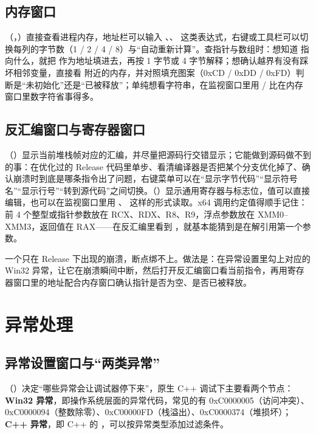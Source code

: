 {\subsection{内存窗口}

（，）直接查看进程内存，地址栏可以输入 、、 这类表达式，右键或工具栏可以切换每列的字节数（1 / 2 / 4 / 8）与“自动重新计算”。查指针与数组时：想知道  指向什么，就把  作为地址填进去，再按 1 字节或 4 字节解释；想确认越界有没有踩坏相邻变量，直接看  附近的内存，并对照填充图案（0xCD / 0xDD / 0xFD）判断是“未初始化”还是“已被释放”；单纯想看字符串，在监视窗口里用  /  比在内存窗口里数字符省事得多。

\subsection{反汇编窗口与寄存器窗口}

（）显示当前堆栈帧对应的汇编，并尽量把源码行交错显示；它能做到源码做不到的事：在优化过的 Release 代码里单步、看清编译器是否把某个分支优化掉了、确认崩溃时到底是哪条指令出了问题，右键菜单可以在“显示字节代码”“显示符号名”“显示行号”“转到源代码”之间切换。（）显示通用寄存器与标志位，值可以直接编辑，也可以在监视窗口里用 、 这样的形式读取。x64 调用约定值得顺手记住：前 4 个整型或指针参数放在 RCX、RDX、R8、R9，浮点参数放在 XMM0--XMM3，返回值在 RAX——在反汇编里看到 ，就基本能猜到是在解引用第一个参数。

\begin{keybox}[实战场景]
一个只在 Release 下出现的崩溃，断点绑不上。做法是：在异常设置里勾上对应的 Win32 异常，让它在崩溃瞬间中断，然后打开反汇编窗口看当前指令，再用寄存器窗口里的地址配合内存窗口确认指针是否为空、是否已被释放。
\end{keybox}

\section{异常处理}

\subsection{异常设置窗口与“两类异常”}

（）决定“哪些异常会让调试器停下来”，原生 C++ 调试下主要看两个节点：\textbf{Win32 异常}，即操作系统层面的异常代码，常见的有 0xC0000005（访问冲突）、0xC0000094（整数除零）、0xC00000FD（栈溢出）、0xC0000374（堆损坏）；\textbf{C++ 异常}，即 C++ 的 ，可以按异常类型添加过滤条件。

}
